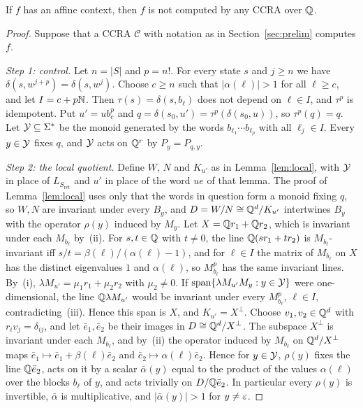 \begin{theorem}\label{thm:affinecontext}
If $f$ has an affine context, then $f$ is not computed by any CCRA over $\mathbb{Q}$.
\end{theorem}
\begin{proof}
Suppose that a CCRA $\mathcal C$ with notation as in Section~\ref{sec:prelim} computes $f$.

\emph{Step 1: control.} Let $n=|S|$ and $p=n!$. For every state $s$ and $j\ge n$ we have $\delta(s,w^{j+p})=\delta(s,w^j)$. Choose $c\ge n$ such that $|\alpha(\ell)|>1$ for all $\ell\ge c$, and let $I=c+p\mathbb{N}$. Then $\tau(s)=\delta(s,b_\ell)$ does not depend on $\ell\in I$, and $\tau^p$ is idempotent. Put $u'=ub_c^p$ and $q=\delta(s_0,u')=\tau^p(\delta(s_0,u))$, so $\tau^p(q)=q$. Let $\mathcal{Y}\subseteq\Sigma^*$ be the monoid generated by the words $b_{\ell_1}\cdots b_{\ell_p}$ with all $\ell_j\in I$. Every $y\in\mathcal{Y}$ fixes $q$, and $\mathcal{Y}$ acts on $\mathbb{Q}^r$ by $P_y=P_{q,y}$.

\emph{Step 2: the local quotient.} Define $W$, $N$ and $K_{u'}$ as in Lemma~\ref{lem:local}, with $\mathcal{Y}$ in place of $L_{S_{\mathrm{ret}}}$ and $u'$ in place of the word $ue$ of that lemma. The proof of Lemma~\ref{lem:local} uses only that the words in question form a monoid fixing $q$, so $W,N$ are invariant under every $B_y$, and $D=W/N\cong\mathbb{Q}^d/K_{u'}$ intertwines $B_y$ with the operator $\rho(y)$ induced by $M_y$. Let $X=\mathbb{Q} r_1+\mathbb{Q} r_2$, which is invariant under each $M_{b_\ell}$ by~(ii). For $s,t\in\mathbb{Q}$ with $t\ne0$, the line $\mathbb{Q}(sr_1+tr_2)$ is $M_{b_\ell}$-invariant iff $s/t=\beta(\ell)/(\alpha(\ell)-1)$, and for $\ell\in I$ the matrix of $M_{b_\ell}$ on $X$ has the distinct eigenvalues $1$ and $\alpha(\ell)$, so $M_{b_\ell}^p$ has the same invariant lines. By~(i), $\lambda M_{u'}=\mu_1r_1+\mu_2r_2$ with $\mu_2\ne0$. If $\operatorname{span}\{\lambda M_{u'}M_y:y\in\mathcal{Y}\}$ were one-dimensional, the line $\mathbb{Q}\lambda M_{u'}$ would be invariant under every $M_{b_\ell}^p$, $\ell\in I$, contradicting~(iii). Hence this span is $X$, and $K_{u'}=X^\perp$. Choose $v_1,v_2\in\mathbb{Q}^d$ with $r_iv_j=\delta_{ij}$, and let $\bar e_1,\bar e_2$ be their images in $D\cong\mathbb{Q}^d/X^\perp$. The subspace $X^\perp$ is invariant under each $M_{b_\ell}$, and by~(ii) the operator induced by $M_{b_\ell}$ on $\mathbb{Q}^d/X^\perp$ maps $\bar e_1\mapsto\bar e_1+\beta(\ell)\bar e_2$ and $\bar e_2\mapsto\alpha(\ell)\bar e_2$. Hence for $y\in\mathcal{Y}$, $\rho(y)$ fixes the line $\mathbb{Q}\bar e_2$, acts on it by a scalar $\bar\alpha(y)$ equal to the product of the values $\alpha(\ell)$ over the blocks $b_\ell$ of $y$, and acts trivially on $D/\mathbb{Q}\bar e_2$. In particular every $\rho(y)$ is invertible, $\bar\alpha$ is multiplicative, and $|\bar\alpha(y)|>1$ for $y\ne\varepsilon$.


\end{proof}
